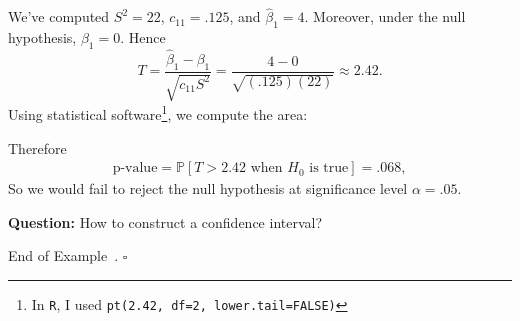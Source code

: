 \documentclass[10pt]{article}
\theoremstyle{definition}
\newtheorem{example}[theorem]{Example}
\renewenvironment{example}
{\begin{oldexample}}
  {\par\smallskip\hfill   End of Example~\theexample. $\square$    \par\end{oldexample}}
\newcommand{\vt}{\vskip 5mm} %
\newcommand{\Fl}{\vt\noindent\textbf} %
\newcommand{\1}[1]{\textbf{1}_{\left[#1\right]}} %
\def\P{\mathbb{P}} %
\begin{document}
\begin{example}
  We've computed $S^{2}=22$, $c_{11} = .125$, and $\widehat{\beta}_{1}=4$.
  Moreover, under the null hypothesis, $\beta_{1}=0$. Hence
  \begin{equation*}
    T = \frac{\widehat{\beta}_{1}-\beta_{1}}{\sqrt{c_{11}S^{2}}} = \frac{4-0}{\sqrt{(.125)(22)}} \approx 2.42.
  \end{equation*}
  Using statistical software\footnote{In \texttt{R}, I used \texttt{pt(2.42,
      df=2, lower.tail=FALSE)}}, we compute the area:
  \begin{center}
  \end{center}  
  Therefore
  \begin{align*}
    \text{p-value} = \P\left[T>2.42 \text{ when }H_{0} \text{ is true} \right] = .068,
  \end{align*}
  So we would fail to reject the null hypothesis at significance level
  $\alpha=.05$.
  
  \Fl{Question:} How to construct a confidence interval?


\end{example}
\end{document}
